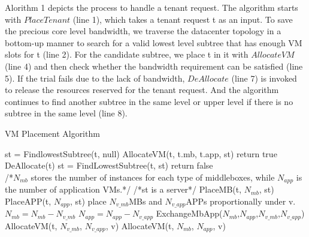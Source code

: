 \documentclass[review]{elsarticle}
\begin{document}
Alorithm 1 depicts the process to handle a tenant request. The algorithm starts with $PlaceTenant$ (line 1), which takes a tenant request t as an input. To save the precious core level bandwidth, we traverse the datacenter topology in a bottom-up manner to search for a valid lowest level subtree that has enough VM slots for t (line 2). For the candidate subtree, we place t in it with $AllocateVM$ (line 4) and then check whether the bandwidth requirement can be satisfied (line 5). If the trial fails due to the lack of bandwidth, $DeAllocate$ (line 7) is invoked to release the resources reserved for the tenant request. And the algorithm continues to find another subtree in the same level or upper level if there is no subtree in the same level (line 8). 
\begin{algorithm}[!htbp]
	\caption{VM Placement Algorithm}
	\label{alg1}
	\begin{algorithmic}[1]
		\State st = FindlowestSubtree(t, null)
		   \State AllocateVM(t, t.mb, t.app, st)
			   \State return true
		   \EndIf 
		   \State DeAllocate(t)
		   \State st = FindLowestSubtree(t, st)
		\EndWhile
		\State return false
	  \EndFunction
	  \\
	  /*$N_{mb}$ stores the number of instances for each type of middleboxes, while $N_{app}$ is the number of application VMs.*/
	   /*st is a server*/
		  \State PlaceMB(t, $N_{mb}$, st)
		  \State PlaceAPP(t, $N_{app}$, st)
	  \Else
				  \State place $N_{v\_mb}$MBs and $N_{v\_app}$APPs \State proportionally under v.
				  \State $N_{mb} = N_{mb} - N_{v\_mb}$
				  \State $N_{app} = N_{app} - N_{v\_app}$
				  \State ExchangeMbApp($N_{mb}$,$N_{app}$,$N_{v\_mb}$,$N_{v\_app}$)
				  \State AllocateVM(t, $N_{v\_mb}$, $N_{v\_app}$, v)
		      \Else
			      \State AllocateVM(t, $N_{mb}$, $N_{app}$, v)
			  \EndIf
		\EndIf
	  \EndFor
	\EndIf
   \EndFunction %
\end{algorithmic}
\end{algorithm}
\end{document}
